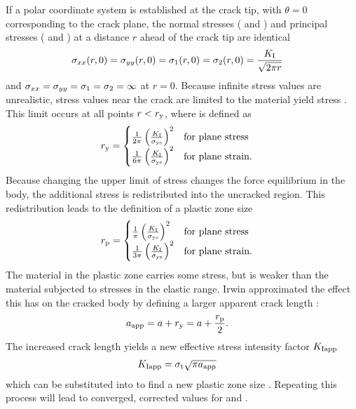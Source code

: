 If a polar coordinate system is established at the crack tip, with \(\theta=0\) corresponding to the crack plane, the normal stresses (\Sxx{} and \Syy{}) and principal stresses (\Sone{} and \Stwo{}) at a distance \(r\) ahead of the crack tip are identical
\begin{align}
\sigma_{xx}(r,0) &= \sigma_{yy}(r,0) = \sigma_{1}(r,0) = \sigma_{2}(r,0) = \frac{K_\textnormal{I}}{\sqrt{2\pi r}} \label{eq:singularity}
\end{align}
and \(\sigma_{xx} = \sigma_{yy} = \sigma_{1} = \sigma_{2} = \infty\) at \(r=0\).
Because infinite stress values are unrealistic, stress values near the crack are limited to the material yield stress \Sys{}.
This limit occurs at all points \(r<r_{\textnormal{y}}\), where \ry{} is defined as
  \begin{align}
  r_{\textnormal{y}} &=
    \begin{cases}
      \frac{1}{2\pi} \left( \frac{K_\textnormal{I}}{\sigma_{\textnormal{ys}}} \right)^2 & \textnormal{for plane stress} \\
      \frac{1}{6\pi} \left( \frac{K_\textnormal{I}}{\sigma_{\textnormal{ys}}} \right)^2 & \textnormal{for plane strain.} \\
    \end{cases} \label{eq:ry}
  \end{align}
Because changing the upper limit of stress changes the force equilibrium in the body, the additional stress is redistributed into the uncracked region.
This redistribution leads to the definition of a plastic zone size \rp{}
\begin{align}
  r_{\textnormal{p}} &=
    \begin{cases}
      \frac{1}{\pi} \left( \frac{K_\textnormal{I}}{\sigma_{\textnormal{ys}}} \right)^2 & \textnormal{for plane stress} \\
      \frac{1}{3\pi} \left( \frac{K_\textnormal{I}}{\sigma_{\textnormal{ys}}} \right)^2 & \textnormal{for plane strain.}
    \end{cases} \label{eq:rp}
\end{align}
The material in the plastic zone carries some stress, but is weaker than the material subjected to stresses in the elastic range.
Irwin approximated the effect this has on the cracked body by defining a larger apparent crack length \aapp:
\begin{align}
a_{\textnormal{app}} &= a+r_{\textnormal{y}} = a + \frac{r_{\textnormal{p}}}{2}.
\end{align}
The increased crack length yields a new effective stress intensity factor \(K_{\textnormal{Iapp}}\)
\begin{align}
K_{\textnormal{Iapp}} &= \sigma_{\textnormal{t}} \sqrt{\pi a_{\textnormal{app}}} \label{eq:kiapp}
\end{align}
which can be substituted into  to find a new plastic zone size \rp.
Repeating this process will lead to converged, corrected values for \KI and \aapp.

